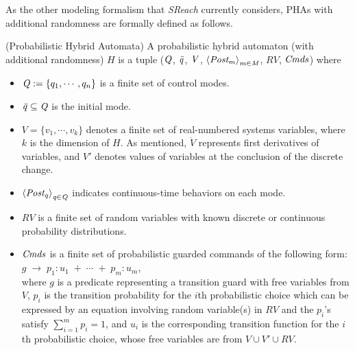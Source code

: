 \vspace{-.4cm}
As the other modeling formalism that {\it SReach} currently considers, PHAs with additional randomness are formally defined as follows.
\vspace{-.4cm}
\begin{definition}
\label{def:pha}
{\rm(Probabilistic Hybrid Automata)} A probabilistic hybrid automaton  (with additional randomness) $H$ is a tuple (${\it Q}$, ${\it \bar{q}}$, ${\it V}$, ${\it \left \langle Post_m \right \rangle_{m \in M}}$, $RV$, ${\it Cmds}$) where
\vspace{-.4cm}
\begin{itemize}
\item ${\it Q} := \{ q_1, \cdots, q_n \}$ is a finite set of control modes.
\vspace{-.2cm}
\item ${\it \bar{q}} \subseteq {\it Q}$ is the initial mode.
\vspace{-.2cm}
\item $V = \{ v_1, \cdots, v_k \}$ denotes a finite set of real-numbered systems variables, where $k$ is the dimension of $H$. As mentioned, $\dot{V}$ represents first derivatives of variables, and $V'$ denotes values of variables at the conclusion of the discrete change.
\vspace{-.2cm}
\item ${\it \left \langle Post_q \right \rangle_{q \in Q}}$ indicates continuous-time behaviors on each mode. 
\vspace{-.2cm}
\item $RV$ is a finite set of random variables with known discrete or continuous probability distributions.
\vspace{-.2cm}
\item ${\it Cmds}$ is a finite set of probabilistic guarded commands of the following form: \\
$g \; \rightarrow \; p_1:u_1 \; + \; \cdots \; + \; p_m:u_m$,\\
where $g$ is a predicate representing a transition guard with free variables from $V$, $p_i$ is the transition probability for the $i$th probabilistic choice which can be expressed by an equation involving random variable(s) in $RV$ 
and the $p_i$'s satisfy $\sum_{i=1}^m p_i =1$, and $u_i$ is the corresponding transition function for the $i$th probabilistic choice, whose free variables are from $V \cup V' \cup RV$.
\end{itemize}
\end{definition}
\vspace{-.4cm}
